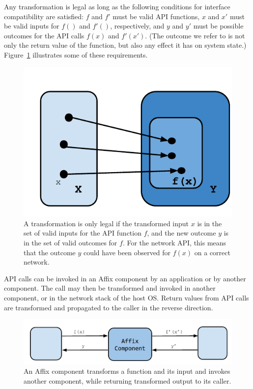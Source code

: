 Any transformation is legal as long as the following 
conditions for interface compatibility 
are satisfied: $f$ and $f'$ must be valid 
API functions, $x$ and $x'$
must be valid inputs for $f()$ and $f'()$, respectively, and
$y$ and $y'$ must be possible outcomes for
the API calls $f(x)$ and $f'(x')$. (The outcome we refer to is 
not only the return value of the function, but also any effect it has
on system state.)
Figure~\ref{fig-fn} illustrates some of these requirements.

\begin{figure}[htb]
  \centering
  \includegraphics[width=0.5\linewidth]{figs/fn.pdf} 
  \caption{A transformation is only legal if
  the transformed input $x$ is in the set of valid inputs for the API function
  $f$, and the new outcome $y$ is in the set 
  of valid outcomes for $f$. For the network API, this means 
  that the outcome $y$ could have been observed 
  for $f(x)$ on a correct network.}
  \label{fig-fn}
\end{figure}

API calls can be invoked in an 
Affix component by an application or by another component.
The call may then be transformed and invoked in another component, 
or in the network stack of the host \ac{OS}.
Return values from API calls are transformed and propagated to the 
caller in the reverse direction.



\begin{figure}[htb]
  \centering
  \includegraphics[width=\linewidth]{figs/component_wide.pdf} 
  \caption{An Affix component transforms a function and its input and invokes 
  another component, while returning transformed output
  to its caller. 
  }
  \label{fig-component}
\end{figure}



